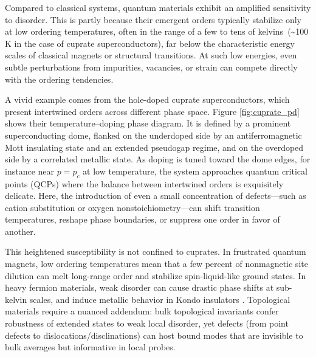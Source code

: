 Compared to classical systems, quantum materials exhibit an amplified sensitivity to disorder. This is partly because their emergent orders typically stabilize only at low ordering temperatures, often in the range of a few to tens of kelvins~(\textasciitilde100 K in the case of cuprate superconductors), far below the characteristic energy scales of classical magnets or structural transitions. At such low energies, even subtle perturbations from impurities, vacancies, or strain can compete directly with the ordering tendencies.

A vivid example comes from the hole-doped cuprate superconductors, which present intertwined orders across different phase space\cite{fradkinIntertwinedOrdersPhysics2025}. Figure \ref {fig:cuprate_pd} shows their temperature–doping phase diagram. It is defined by a prominent superconducting dome, flanked on the underdoped side by an antiferromagnetic Mott insulating state and an extended pseudogap regime, and on the overdoped side by a correlated metallic state. As doping is tuned toward the dome edges, for instance near $p=p_c$ at low temperature, the system approaches quantum critical points (QCPs) where the balance between intertwined orders is exquisitely delicate. Here, the introduction of even a small concentration of defects—such as cation substitution or oxygen nonstoichiometry—can shift transition temperatures, reshape phase boundaries, or suppress one order in favor of another.

This heightened susceptibility is not confined to cuprates. In frustrated quantum magnets, low ordering temperatures mean that a few percent of nonmagnetic site dilution can melt long-range order and stabilize spin-liquid-like ground states\cite{syzranovEffectVacancyDefects2022}. In heavy fermion materials, weak disorder can cause drastic phase shifts at sub-kelvin scales\cite{toldinDisorderQuasiparticleInterference2013,gegenwartQuantumCriticalityHeavyfermion2008}, and induce metallic behavior in Kondo insulators \cite{pirieVisualizingAtomicscaleOrigin2023}. Topological materials require a nuanced addendum: bulk topological invariants confer robustness of extended states to weak local disorder, yet defects (from point defects to dislocations/disclinations) can host bound modes that are invisible to bulk averages but informative in local probes\cite{yamadaBoundStatesPartial2022,xueObservationDislocationInducedTopological2021}. 

